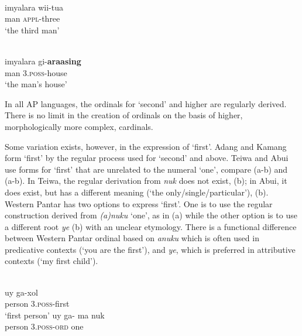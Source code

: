 \documentclass[output=paper]{LSP/langsci}
\begin{document}
  

  


\ea%
\label{bkm:Ref355277550}
\\
\gll   imyalara   wii-tua\\  
   man    \textsc{appl-}three \\
\glt  `the third man'
\z

  

  




\ea%
\label{bkm:Ref342737790}
\\
\gll imyalara   gi-\textbf{araasing} \\  
    man    3.\textsc{poss}-house   \\
\glt`the man's house'
\z
 

In all AP languages, the ordinals for `second' and higher are regularly derived. There is no limit in the creation of ordinals on the basis of higher, morphologically more complex, cardinals.

Some variation exists, however, in the expression of `first'. Adang and Kamang form `first' by the regular process used for `second' and above. Teiwa and Abui use forms for `first' that are unrelated to the numeral `one', compare  (a-b) and  (a-b). In Teiwa, the regular derivation from \textit{nuk} does not exist, (b); in Abui, it does exist, but has a different meaning (`the only/single/particular'), (b). Western Pantar has two options to express `first'. One is to use the regular construction derived from \textit{(a)nuku} `one', as in (a) while the other option is to use a different root \textit{ye} (b) with an unclear etymology. There is a functional difference between Western Pantar ordinal based on \textit{anuku} which is often used in predicative contexts (`you are the first'), and \textit{ye}, which is preferred in attributive contexts (`my first child'). 


\ea%
\label{bkm:Ref342651040}
\\
\ea
\gll  uy    ga-xol \\  
     person    3\textsc{.poss}-first\\
\glt`first person'
\ex
\gll *uy    ga- ma    nuk\\
person    3\textsc{.poss-ord } one\\ 
\z\z
 
\end{document}
